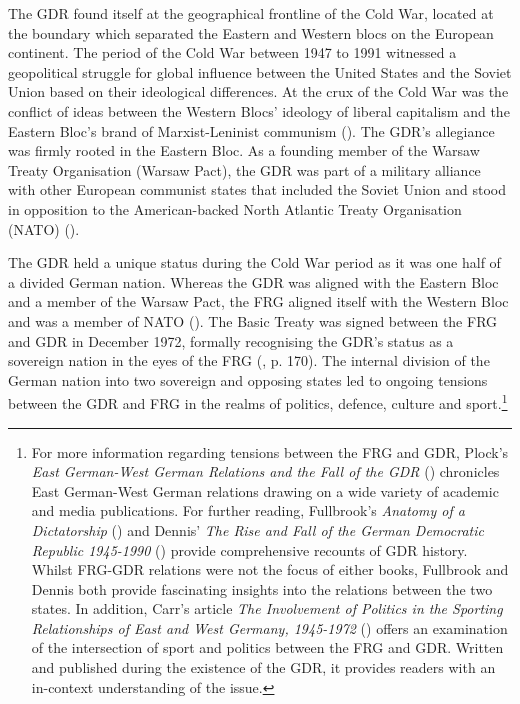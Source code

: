 The GDR found itself at the geographical frontline of the Cold War, located at the boundary which separated the Eastern and Western blocs on the European continent. The period of the Cold War between 1947 to 1991 witnessed a geopolitical struggle for global influence between the United States and the Soviet Union based on their ideological differences. At the crux of the Cold War was the conflict of ideas between the Western Blocs’ ideology of liberal capitalism and the Eastern Bloc’s brand of Marxist-Leninist communism (\cite{sargent2015}). The GDR’s allegiance was firmly rooted in the Eastern Bloc. As a founding member of the Warsaw Treaty Organisation (Warsaw Pact), the GDR was part of a military alliance with other European communist states that included the Soviet Union and stood in opposition to the American-backed North Atlantic Treaty Organisation (NATO) (\cite{wagner2012}).

The GDR held a unique status during the Cold War period as it was one half of a divided German nation. Whereas the GDR was aligned with the Eastern Bloc and a member of the Warsaw Pact, the FRG aligned itself with the Western Bloc and was a member of NATO (\cite{wagner2012}). The Basic Treaty was signed between the FRG and GDR in December 1972, formally recognising the GDR’s status as a sovereign nation in the eyes of the FRG (\cite{dennis2000}, p. 170). The internal division of the German nation into two sovereign and opposing states led to ongoing tensions between the GDR and FRG in the realms of politics, defence, culture and sport.\footnote{For more information regarding tensions between the FRG and GDR, Plock’s \textit{East German-West German Relations and the Fall of the GDR} (\citeyear{plock1993}) chronicles East German-West German relations drawing on a wide variety of academic and media publications. For further reading, Fullbrook’s \textit{Anatomy of a Dictatorship} (\citeyear{fullbrook1995}) and Dennis’ \textit{The Rise and Fall of the German Democratic Republic 1945-1990} (\citeyear{dennis2000}) provide comprehensive recounts of GDR history. Whilst FRG-GDR relations were not the focus of either books, Fullbrook and Dennis both provide fascinating insights into the relations between the two states. In addition, Carr’s article \textit{The Involvement of Politics in the Sporting Relationships of East and West Germany, 1945-1972} (\citeyear{carr1980}) offers an examination of the intersection of sport and politics between the FRG and GDR. Written and published during the existence of the GDR, it provides readers with an in-context understanding of the issue.}

